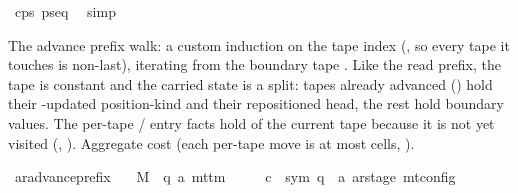 \begin{isabellebody}
\ c{\isacharprime}{\kern0pt}{\isacharunderscore}{\kern0pt}ps\ ps{\isacharunderscore}{\kern0pt}eq\ \isamarkupfalse%
\ simp\isanewline
\ \ \isamarkupfalse%
\isanewline
{}\isamarkupfalse%
%
\endisatagproof
{\isafoldproof}%
%
\isadelimproof
%
\endisadelimproof
%
\begin{isamarkuptext}%
The advance prefix walk: a custom induction on the tape index
   (, so every tape it touches is
  non-last), iterating  from the boundary
  tape .  Like the read prefix, the tape is constant and the carried state is
  a  split: tapes already advanced
  () hold their -updated
  position-kind and their repositioned head, the rest hold boundary
  values.  The per-tape / entry facts hold of
  the current tape  because it is not yet visited
  (, ).
  Aggregate cost  (each per-tape move is at most
   cells, ).%
\end{isamarkuptext}\isamarkuptrue%
\isamarkupfalse%
\ ar{\isacharunderscore}{\kern0pt}advance{\isacharunderscore}{\kern0pt}prefix{\isacharcolon}{\kern0pt}\isanewline
\ \ \ M\ {\isacharcolon}{\kern0pt}{\isacharcolon}{\kern0pt}\ {\isachardoublequoteopen}{\isacharparenleft}{\kern0pt}{\isacharprime}{\kern0pt}q{\isacharcomma}{\kern0pt}\ {\isacharprime}{\kern0pt}a{\isacharparenright}{\kern0pt}\ mttm{\isachardoublequoteclose}\isanewline
\ \ \ \ \ c{}\ {\isacharcolon}{\kern0pt}{\isacharcolon}{\kern0pt}\ {\isachardoublequoteopen}{\isacharparenleft}{\kern0pt}sym{}{\isacharcomma}{\kern0pt}\ {\isacharprime}{\kern0pt}q\ {\isasymtimes}\ {\isacharprime}{\kern0pt}a\ ar{\isacharunderscore}{\kern0pt}stage{\isacharparenright}{\kern0pt}\ mt{\isacharunderscore}{\kern0pt}config{\isachardoublequoteclose}\isanewline

\end{isabellebody}
